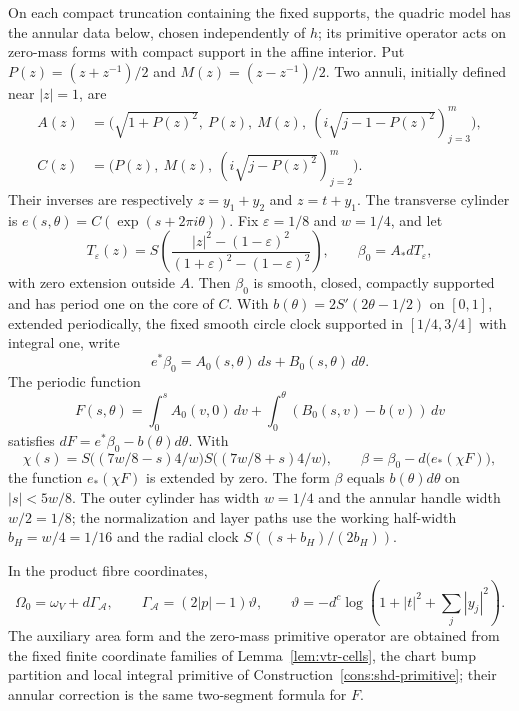 \begin{proposition}\label{prop:vtr-handle}
On each compact truncation containing the fixed supports, the quadric model has the annular data below, chosen independently of $h$;
its primitive operator acts on zero-mass forms with compact support in the affine interior. Put $P(z)=(z+z^{-1})/2$ and
$M(z)=(z-z^{-1})/2$. Two annuli, initially defined near $|z|=1$, are
\[
 \begin{split}
 A(z)&=\bigl(\sqrt{1+P(z)^2},\ P(z),\ M(z),\ (i\sqrt{j-1-P(z)^2})_{j=3}^m\bigr),\\
 C(z)&=\bigl(P(z),\ M(z),\ (i\sqrt{j-P(z)^2})_{j=2}^m\bigr).
 \end{split}
\]
Their inverses are respectively $z=y_1+y_2$ and $z=t+y_1$. The transverse cylinder is $e(s,\theta)=C(\exp(s+2\pi i\theta))$. Fix
$\varepsilon=1/8$ and $w=1/4$, and let
\[
 T_\varepsilon(z)=S\!\left(\frac{|z|^2-(1-\varepsilon)^2}{(1+\varepsilon)^2-(1-\varepsilon)^2}\right),
 \qquad \beta_0=A_*dT_\varepsilon,
\]
with zero extension outside $A$. Then $\beta_0$ is smooth, closed, compactly supported and has period one on the core of $C$. With
$b(\theta)=2S'(2\theta-1/2)$ on $[0,1]$, extended periodically, the fixed smooth circle clock supported in $[1/4,3/4]$ with integral
one, write
\[
 e^*\beta_0=A_0(s,\theta)\,ds+B_0(s,\theta)\,d\theta.
\]
The periodic function
\[
 F(s,\theta)=\int_0^s A_0(v,0)\,dv+\int_0^\theta(B_0(s,v)-b(v))\,dv
\]
satisfies $dF=e^*\beta_0-b(\theta)d\theta$. With
\[
 \chi(s)=S\bigl((7w/8-s)4/w\bigr)S\bigl((7w/8+s)4/w\bigr),\qquad
 \beta=\beta_0-d\bigl(e_*(\chi F)\bigr),
\]
the function $e_*(\chi F)$ is extended by zero. The form $\beta$ equals $b(\theta)d\theta$ on $|s|<5w/8$. The outer cylinder has
width $w=1/4$ and the annular handle width $w/2=1/8$; the normalization and layer paths use the working half-width $b_H=w/4=1/16$
and the radial clock $S((s+b_H)/(2b_H))$.

In the product fibre coordinates,
\[
 \Omega_0=\omega_V+d\Gamma_{\mathcal A},\qquad
 \Gamma_{\mathcal A}=(2|p|-1)\vartheta,\qquad
 \vartheta=-d^c\log(1+|t|^2+\textstyle\sum_j|y_j|^2).
\]
The auxiliary area form and the zero-mass primitive operator are obtained from the fixed finite coordinate families of
Lemma~\ref{lem:vtr-cells}, the chart bump partition and local integral primitive of Construction~\ref{cons:shd-primitive}; their
annular correction is the same two-segment formula for $F$.
\end{proposition}

